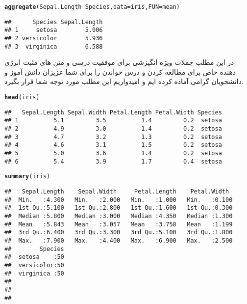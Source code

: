 \documentclass[12pt,usenames,dvipsnames]{report}\usepackage[]{graphicx}\usepackage[]{xcolor}
\makeatletter
\newcommand{\hlopt}[1]{\textcolor[rgb]{0,0,0}{#1}}%
\newcommand{\hlstd}[1]{\textcolor[rgb]{0.345,0.345,0.345}{#1}}%
\newcommand{\hlkwc}[1]{\textcolor[rgb]{0.333,0.667,0.333}{#1}}%
\newcommand{\hlkwd}[1]{\textcolor[rgb]{0.737,0.353,0.396}{\textbf{#1}}}%
\newenvironment{kframe}{%
 \def\at@end@of@kframe{}%
 \ifinner\ifhmode%
  \def\at@end@of@kframe{\end{minipage}}%
  \begin{minipage}{\columnwidth}%
 \fi\fi%
 \def\FrameCommand##1{\hskip\@totalleftmargin \hskip-\fboxsep
 \colorbox{shadecolor}{##1}\hskip-\fboxsep
     \hskip-\linewidth \hskip-\@totalleftmargin \hskip\columnwidth}%
 \MakeFramed {\advance\hsize-\width
   \@totalleftmargin\z@ \linewidth\hsize
   \@setminipage}}%
 {\par\unskip\endMakeFramed%
 \at@end@of@kframe}
\newenvironment{knitrout}{}{} %
\makeatother
\begin{document}
\begin{knitrout}
\color{fgcolor}\begin{kframe}
\latin 
\begin{alltt}
\hlkwd{aggregate}\hlstd{(Sepal.Length}\hlopt{~}\hlstd{Species,}\hlkwc{data} \hlstd{= iris,}\hlkwc{FUN} \hlstd{= mean)}
\end{alltt}
\persian 
\latin 
\begin{verbatim}
##      Species Sepal.Length
## 1     setosa        5.006
## 2 versicolor        5.936
## 3  virginica        6.588
\end{verbatim}
\persian 
\end{kframe}
\end{knitrout}


در این مطلب جملات ویژه انگیزشی برای موفقیت درسی و متن های مثبت انرژی دهنده خاص برای مطالعه کردن و درس خواندن را برای شما عزیزان دانش آموز و دانشجویان گرامی آماده کرده ایم و امیدواریم این مطلب مورد توجه شما قرار بگیرد.

\begin{knitrout}
\color{fgcolor}\begin{kframe}
\latin 
\begin{alltt}
\hlkwd{head}\hlstd{(iris)}
\end{alltt}
\persian 
\latin 
\begin{verbatim}
##   Sepal.Length Sepal.Width Petal.Length Petal.Width Species
## 1          5.1         3.5          1.4         0.2  setosa
## 2          4.9         3.0          1.4         0.2  setosa
## 3          4.7         3.2          1.3         0.2  setosa
## 4          4.6         3.1          1.5         0.2  setosa
## 5          5.0         3.6          1.4         0.2  setosa
## 6          5.4         3.9          1.7         0.4  setosa
\end{verbatim}
\persian 
\end{kframe}
\end{knitrout}

\begin{knitrout}
\color{fgcolor}\begin{kframe}
\latin 
\begin{alltt}
\hlkwd{summary}\hlstd{(iris)}
\end{alltt}
\persian 
\latin 
\begin{verbatim}
##   Sepal.Length    Sepal.Width     Petal.Length    Petal.Width   
##  Min.   :4.300   Min.   :2.000   Min.   :1.000   Min.   :0.100  
##  1st Qu.:5.100   1st Qu.:2.800   1st Qu.:1.600   1st Qu.:0.300  
##  Median :5.800   Median :3.000   Median :4.350   Median :1.300  
##  Mean   :5.843   Mean   :3.057   Mean   :3.758   Mean   :1.199  
##  3rd Qu.:6.400   3rd Qu.:3.300   3rd Qu.:5.100   3rd Qu.:1.800  
##  Max.   :7.900   Max.   :4.400   Max.   :6.900   Max.   :2.500  
##        Species  
##  setosa    :50  
##  versicolor:50  
##  virginica :50  
##                 
##                 
## 
\end{verbatim}
\persian 
\end{kframe}
\end{knitrout}
\end{document}

